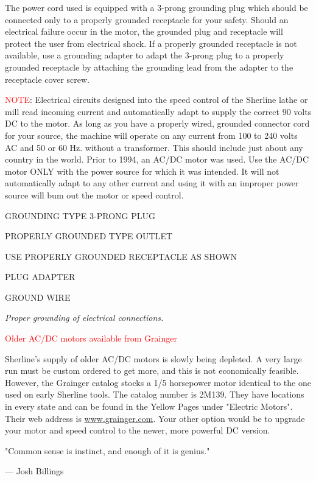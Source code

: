 
The power cord used is equipped with a 3-prong grounding plug which should be
connected only to a properly grounded receptacle for your safety. Should an
electrical failure occur in the motor, the grounded plug and receptacle will
protect the user from electrical shock. If a properly grounded receptacle is not
available, use a grounding adapter to adapt the 3-prong plug to a properly
grounded receptacle by attaching the grounding lead from the adapter to the
receptacle cover screw.

\textcolor{Red}{NOTE}: Electrical circuits designed into the speed control of
the Sherline lathe or mill read incoming current and automatically adapt to
supply the correct 90 volts DC to the motor. As long as you have a properly
wired, grounded connector cord for your source, the machine will operate on any
current from 100 to 240 volts AC and 50 or 60 Hz. without a transformer. This should include just about any country in the world. Prior
to 1994, an AC/DC motor was used. Use the AC/DC motor ONLY with the power source
for which it was intended. It will not automatically adapt to any other current
and using it with an improper power source will bum out the motor or speed
control.

\bigskip

GROUNDING TYPE 3-PRONG PLUG

PROPERLY GROUNDED TYPE OUTLET

USE PROPERLY GROUNDED RECEPTACLE AS SHOWN

PLUG ADAPTER

GROUND WIRE

\bigskip
\textit{Proper grounding of electrical connections.}
\bigskip

\textcolor{Red}{Older AC/DC motors available from Grainger}\bigskip

Sherline's supply of older AC/DC motors is slowly being depleted. A very large
run must be custom ordered to get more, and this is not economically feasible.
However, the Grainger catalog stocks a 1/5 horsepower motor identical to the one
used on early Sherline tools. The catalog number is 2M139. They have locations
in every state and can be found in the Yellow Pages under "Electric Motors".
Their web address is \url{www.grainger.com}. Your other option would be to
upgrade your motor and speed control to the newer, more powerful DC version.

\bigskip
\begin{centering}

"Common sense is instinct, and enough of it is genius."

--- Josh Billings

\end{centering}
  
\secup\secup
